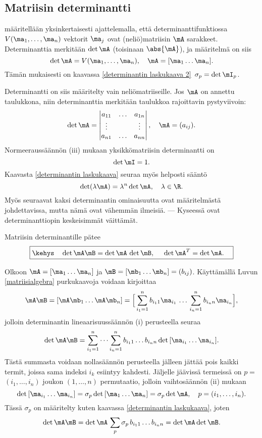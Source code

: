 \subsection{Matriisin determinantti}

 määritellään yksinkertaisesti ajattelemalla, että 
determinanttifunktiossa $V(\ma_1,\ldots,\ma_n)$ vektorit $\ma_j$ ovat (neliö)matriisin $\mA$ 
sarakkeet. Determinanttia merkitään $\det\mA$ (toisinaan $\abs{\mA}$), ja määritelmä on siis
\[
\det\mA=V(\ma_1,\ldots,\ma_n), \quad \mA=[\ma_1 \ldots \ma_n].
\]
Tämän mukaisesti on kaavassa \eqref{determinantin laskukaava 2} $\,\sigma_p = \det\mI_p$.

Determinantti on siis määritelty vain neliömatriiseille. Jos $\mA$ on annettu taulukkona, niin
determinanttia merkitään taulukkoa rajoittavin pystyviivoin:
\[
\det\mA=\begin{vmatrix}
a_{11} & \ldots & a_{1n} \\
\vdots &  & \vdots \\
a_{n1} & \ldots & a_{nn}
\end{vmatrix}, \quad \mA=(a_{ij}).
\]
Normeeraussäännön (iii) mukaan yksikkömatriisin determinantti on
\[
\det\mI=1.
\]
Kaavasta \eqref{determinantin laskukaava} seuraa myös helposti sääntö
\[
\det(\lambda\mA)=\lambda^n\det\mA, \quad \lambda \in \R.
\]
Myös seuraavat kaksi determinantin ominaisuutta ovat määritelmästä johdettavissa, mutta nämä
ovat vähemmän ilmeisiä. --- Kyseessä ovat determinanttiopin keskeisimmät väittämät.
\begin{Lause} Matriisin determinantille pätee
\[
\boxed{\kehys \quad \det\mA\mB = \det\mA\,\det\mB, \quad\ \det\mA^T = \det\mA. \quad}
\]
\end{Lause}
\tod Olkoon $\mA=[\ma_1 \ldots \ma_n]$ ja $\mB=[\mb_1 \ldots \mb_n]=(b_{ij})$. Käyttämällä Luvun
\ref{matriisialgebra} purkukaavoja voidaan kirjoittaa
\[
\mA\mB 
= [\mA\mb_1 \ldots \mA\mb_n] 
= \Bigl[\,\sum_{i_1=1}^n b_{i_11}\ma_{i_1}\,\ldots\,\sum_{i_n=1}^n b_{i_nn}\ma_{i_n}\Bigr],
\]
jolloin determinantin lineaarisuussäännön (i) perusteella seuraa
\[
\det\mA\mB 
= \sum_{i_1=1}^n\cdots\sum_{i_n=1}^n b_{i_11}\ldots b_{i_nn}\det\,[\ma_{i_1} \ldots \ma_{i_n}].
\]
Tästä summasta voidaan nollasäännön perusteella jälleen jättää pois kaikki termit, joissa sama
indeksi $i_k$ esiintyy kahdesti. Jäljelle jäävissä termeissä on $p=$ $(i_1,\ldots,i_n)$ joukon 
$(1,\ldots,n)$ permutaatio, jolloin vaihtosäännön (ii) mukaan
\[
\det\,[\ma_{i_1} \ldots \ma_{i_n}] = \sigma_p\det\,[\ma_1 \ldots \ma_n] 
                                  = \sigma_p\det\mA, \quad p=(i_1,\ldots,i_n).
\]
Tässä $\sigma_p$ on määritelty kuten kaavassa \eqref{determinantin laskukaava}, joten
\[
\det\mA\mB = \det\mA\,\sum_p \sigma_p\,b_{i_11}\ldots b_{i_nn} = \det\mA\det\mB.
\]

